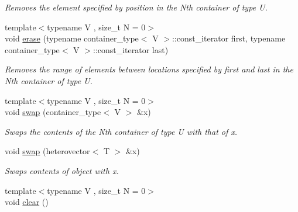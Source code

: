 \begin{DoxyCompactItemize}
\begin{DoxyCompactList}\small\item\em Removes the element specified by position in the Nth container of type U. \end{DoxyCompactList}\item 
\hypertarget{classheterogeneous_1_1heterovector_3_01_t_01_4_ac0d2acbf8d35f5fa97afefdc4a18b62b}{}{\footnotesize template$<$typename V , size\+\_\+t N = 0$>$ }\\void \hyperlink{classheterogeneous_1_1heterovector_3_01_t_01_4_ac0d2acbf8d35f5fa97afefdc4a18b62b}{erase} (typename container\+\_\+type$<$ V $>$\+::const\+\_\+iterator first, typename container\+\_\+type$<$ V $>$\+::const\+\_\+iterator last)\label{classheterogeneous_1_1heterovector_3_01_t_01_4_ac0d2acbf8d35f5fa97afefdc4a18b62b}

\begin{DoxyCompactList}\small\item\em Removes the range of elements between locations specified by first and last in the Nth container of type U. \end{DoxyCompactList}\item 
\hypertarget{classheterogeneous_1_1heterovector_3_01_t_01_4_aaf960fdc2515ed40e4eab4bcf2fabe1c}{}{\footnotesize template$<$typename V , size\+\_\+t N = 0$>$ }\\void \hyperlink{classheterogeneous_1_1heterovector_3_01_t_01_4_aaf960fdc2515ed40e4eab4bcf2fabe1c}{swap} (container\+\_\+type$<$ V $>$ \&x)\label{classheterogeneous_1_1heterovector_3_01_t_01_4_aaf960fdc2515ed40e4eab4bcf2fabe1c}

\begin{DoxyCompactList}\small\item\em Swaps the contents of the Nth container of type U with that of x. \end{DoxyCompactList}\item 
\hypertarget{classheterogeneous_1_1heterovector_3_01_t_01_4_a7fac62ffe9b88ade8e3c19feff0c52fb}{}void \hyperlink{classheterogeneous_1_1heterovector_3_01_t_01_4_a7fac62ffe9b88ade8e3c19feff0c52fb}{swap} (heterovector$<$ T $>$ \&x)\label{classheterogeneous_1_1heterovector_3_01_t_01_4_a7fac62ffe9b88ade8e3c19feff0c52fb}

\begin{DoxyCompactList}\small\item\em Swaps contents of object with x. \end{DoxyCompactList}\item 
\hypertarget{classheterogeneous_1_1heterovector_3_01_t_01_4_ae38e74b498ccd6f465aa2d63042c9854}{}{\footnotesize template$<$typename V , size\+\_\+t N = 0$>$ }\\void \hyperlink{classheterogeneous_1_1heterovector_3_01_t_01_4_ae38e74b498ccd6f465aa2d63042c9854}{clear} ()\label{classheterogeneous_1_1heterovector_3_01_t_01_4_ae38e74b498ccd6f465aa2d63042c9854}


\end{DoxyCompactItemize}
